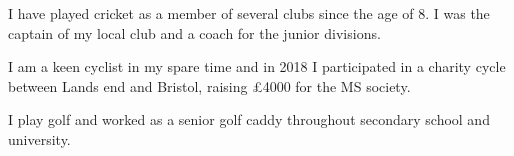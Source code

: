 \begin{cventriesy}
  \cventryy
    {
      \begin{cvitems}
        \item {I have played cricket as a member of several clubs since the age of 8. I was the captain of my local club and a coach for the junior divisions.}
        \item {I am a keen cyclist in my spare time and in 2018 I participated in a charity cycle between Lands end and Bristol, raising £4000 for the MS society.}
        \item {I play golf and worked as a senior golf caddy throughout secondary school and university.}
      \end{cvitems}
    }
\end{cventriesy}
